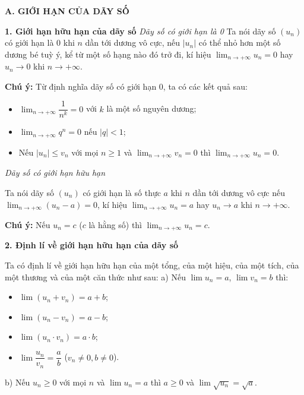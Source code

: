 \documentclass[12pt,a4paper]{extarticle}
\begin{document}
\onehalfspacing

\makeheadbox[headerright={Tổng ôn 10-11},chude={CHỦ ĐỀ 08},tieude={Giới hạn và đạo hàm},dinhdang={Giải tích},lop={12 },gv={Nguyễn Lê Minh Ngọc}]

\vspace{2em}
\noindent\textbf{A. GIỚI HẠN CỦA DÃY SỐ}

\noindent\textbf{1. Giới hạn hữu hạn của dãy số}
\vspace{0.2cm}
\noindent\textit{Dãy số có giới hạn là 0}
\noindent Ta nói dãy số $(u_n)$ có giới hạn là 0 khi $n$ dần tới dương vô cực, nếu $|u_n|$ có thể nhỏ hơn một số dương bé tuỳ ý, kể từ một số hạng nào đó trở đi, kí hiệu $\lim_{n \to +\infty} u_n = 0$ hay $u_n \to 0$ khi $n \to +\infty$.
\vspace{0.2cm}

\noindent\textbf{Chú ý:} Từ định nghĩa dãy số có giới hạn 0, ta có các kết quả sau:
\begin{itemize}
    \item $\lim_{n \to +\infty} \dfrac{1}{n^k} = 0$ với $k$ là một số nguyên dương;
    \item $\lim_{n \to +\infty} q^n = 0$ nếu $|q| < 1$;
    \item Nếu $|u_n| \le v_n$ với mọi $n \ge 1$ và $\lim_{n \to +\infty} v_n = 0$ thì $\lim_{n \to +\infty} u_n = 0$.
\end{itemize}
\vspace{0.6cm}
\noindent\textit{Dãy số có giới hạn hữu hạn}

\noindent Ta nói dãy số $(u_n)$ có giới hạn là số thực $a$ khi $n$ dần tới dương vô cực nếu $\lim_{n \to +\infty} (u_n - a) = 0$, kí hiệu $\lim_{n \to +\infty} u_n = a$ hay $u_n \to a$ khi $n \to +\infty$.
\vspace{0.4cm}

\vspace{0.3cm}
\noindent\textbf{Chú ý:} Nếu $u_n = c$ ($c$ là hằng số) thì $\lim_{n \to +\infty} u_n = c$.
\vspace{0.6cm}

\noindent\textbf{2. Định lí về giới hạn hữu hạn của dãy số}

\noindent Ta có định lí về giới hạn hữu hạn của một tổng, của một hiệu, của một tích, của một thương và của một căn thức như sau:
\vspace{0.2cm}
\noindent a) Nếu $\lim u_n = a$, $\lim v_n = b$ thì:
\begin{itemize}
    \item $\lim(u_n + v_n) = a + b$;
    \item $\lim(u_n - v_n) = a - b$;
    \item $\lim(u_n \cdot v_n) = a \cdot b$;
    \item $\lim \dfrac{u_n}{v_n} = \dfrac{a}{b}$ ($v_n \ne 0, b \ne 0$).
\end{itemize}
\noindent b) Nếu $u_n \ge 0$ với mọi $n$ và $\lim u_n = a$ thì $a \ge 0$ và $\lim \sqrt{u_n} = \sqrt{a}$.
\vspace{0.4cm}
\end{document}
